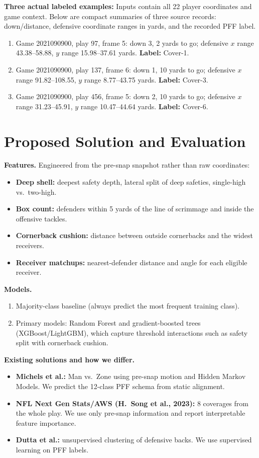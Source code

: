\documentclass[12pt]{article}
\begin{document}
\textbf{Three actual labeled examples:} Inputs contain all 22 player coordinates and game context. Below are compact summaries of three source records: down/distance, defensive coordinate ranges in yards, and the recorded PFF label.
\begin{enumerate}
  \item Game 2021090900, play 97, frame 5: down 3, 2 yards to go; defensive $x$ range 43.38--58.88, $y$ range 15.98--37.61 yards. \textbf{Label:} Cover-1.
  \item Game 2021090900, play 137, frame 6: down 1, 10 yards to go; defensive $x$ range 91.82--108.55, $y$ range 8.77--43.75 yards. \textbf{Label:} Cover-3.
  \item Game 2021090900, play 456, frame 5: down 2, 10 yards to go; defensive $x$ range 31.23--45.91, $y$ range 10.47--44.64 yards. \textbf{Label:} Cover-6.
\end{enumerate}

\section*{Proposed Solution and Evaluation}
\textbf{Features.} Engineered from the pre-snap snapshot rather than raw coordinates:
\begin{itemize}
  \item \textbf{Deep shell:} deepest safety depth, lateral split of deep safeties, single-high vs.\ two-high.
  \item \textbf{Box count:} defenders within 5 yards of the line of scrimmage and inside the offensive tackles.
  \item \textbf{Cornerback cushion:} distance between outside cornerbacks and the widest receivers.
  \item \textbf{Receiver matchups:} nearest-defender distance and angle for each eligible receiver.
\end{itemize}

\textbf{Models.}
\begin{enumerate}
  \item Majority-class baseline (always predict the most frequent training class).
  \item Primary models: Random Forest and gradient-boosted trees (XGBoost/LightGBM), which capture threshold interactions such as safety split with cornerback cushion.
\end{enumerate}

\textbf{Existing solutions and how we differ.}
\begin{itemize}
  \item \textbf{Michels et al.:} Man vs.\ Zone using pre-snap motion and Hidden Markov Models. We predict the 12-class PFF schema from static alignment.
  \item \textbf{NFL Next Gen Stats/AWS (H.\ Song et al., 2023):} 8 coverages from the whole play. We use only pre-snap information and report interpretable feature importance.
  \item \textbf{Dutta et al.:} unsupervised clustering of defensive backs. We use supervised learning on PFF labels.
\end{itemize}
\end{document}
